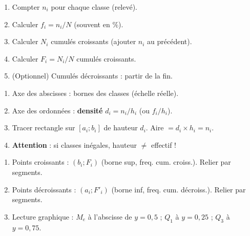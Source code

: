\documentclass[11pt]{article}
\begin{document}
\begin{bilan}
\begin{methode}
  \begin{enumerate}
    \item Compter $n_i$ pour chaque classe (relevé).
    \item Calculer $f_i = n_i/N$ (souvent en $\%$).
    \item Calculer $N_i$ cumulés croissants (ajouter $n_i$ au précédent).
    \item Calculer $F_i = N_i/N$ cumulés croissants.
    \item (Optionnel) Cumulés décroissants : partir de la fin.
  \end{enumerate}
\end{methode}

\begin{methode}[Tracer l'histogramme (aire = effectif)]
  \begin{enumerate}
    \item Axe des abscisses : bornes des classes (échelle réelle).
    \item Axe des ordonnées : \textbf{densité} $d_i = n_i / h_i$ (ou $f_i/h_i$).
    \item Tracer rectangle sur $[a_i; b_i]$ de hauteur $d_i$. Aire $= d_i \times h_i = n_i$.
    \item \textbf{Attention} : si classes inégales, hauteur $\neq$ effectif !
  \end{enumerate}
\end{methode}

\begin{methode}
  \begin{enumerate}
    \item Points croissants : $(b_i ; F_i)$ (borne sup, freq. cum. croiss.). Relier par segments.
    \item Points décroissants : $(a_i ; F'_i)$ (borne inf, freq. cum. décroiss.). Relier par segments.
    \item Lecture graphique : $M_e$ à l'abscisse de $y=0,5$ ; $Q_1$ à $y=0,25$ ; $Q_3$ à $y=0,75$.
  \end{enumerate}
\end{methode}
\end{bilan}
\end{document}
